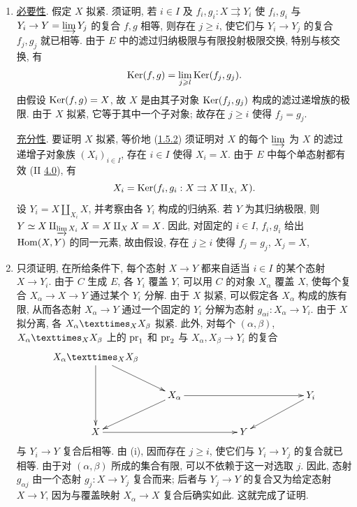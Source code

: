 \begin{enumerate}
\renewcommand{\theenumi}{\roman{enumi}}
\renewcommand{\labelenumi}{(\theenumi)}
\item \underline{必要性}.
假定\pageoriginale{} $X$ 拟紧.
须证明, 若 $i\in I$ 及 $f_i,g_i:X\rightrightarrows Y_i$
使 $f_i,g_i$ 与 $Y_i\to Y=\varinjlim Y_j$ 的复合 $f,g$ 相等,
则存在 $j\geq i$,
使它们与 $Y_i\to Y_j$ 的复合 $f_j,g_j$ 就已相等.
由于 $E$ 中的滤过归纳极限与有限投射极限交换,
特别与核交换, 有
$$
\operatorname{Ker} (f, g) = \mathop{\lim}_{j\geqslant l} \operatorname{Ker} (f_j, g_j){}.
$$
由假设 $\operatorname{Ker}(f,g)=X$,
故 $X$ 是由其子对象 $\operatorname{Ker}(f_j,g_j)$ 构成的滤过递增族的极限.
由于 $X$ 拟紧, 它等于其中一个子对象;
故存在 $j\geq i$ 使得 $f_j=g_j$.

\underline{充分性}.
要证明 $X$ 拟紧,
等价地 (\hyperref[VI.subsubsec1.5.2]{1.5.2})
须证明对 $X$ 的每个 $\varinjlim$ 为 $X$ 的滤过递增子对象族
$(X_i)_{i\in I}$, 存在 $i\in I$ 使得 $X_i=X$.
由于 $E$ 中每个单态射都有效 (II \hyperref[II.sec4]{4.0}), 有
$$
X_i = \operatorname{Ker} (f_i, g_i : X \rightrightarrows X \amalg_{X_{i}} X){}.
$$
设 $Y_i=X\amalg_{X_i}X$,
并考察由各 $Y_i$ 构成的归纳系.
若 $Y$ 为其归纳极限, 则
$Y\simeq X\amalg_{\varinjlim X_i}X=X\amalg_X X=X$.
因此, 对固定的 $i\in I$,
$f_i,g_i$ 给出 $\operatorname{Hom}(X,Y)$ 的同一元素,
故由假设, 存在 $j\geq i$ 使得 $f_j=g_j$,
\ie $X_j=X$, \cqfd

\item 只须\pageoriginale{}证明,
在所给条件下, 每个态射 $X\to Y$
都来自适当 $i\in I$ 的某个态射 $X\to Y_i$.
由于 $C$ 生成 $E$, 各 $Y_i$ 覆盖 $Y$,
可以用 $C$ 的对象 $X_{\alpha}$ 覆盖 $X$,
使每个复合 $X_{\alpha}\to X\to Y$ 通过某个 $Y_i$ 分解.
由于 $X$ 拟紧, 可以假定各 $X_{\alpha}$ 构成的族有限,
从而各态射 $X_{\alpha}\to Y$ 通过一个固定的 $Y_i$
分解为态射 $g_{\alpha i}:X_{\alpha}\to Y_i$.
由于 $X$ 拟分离, 各 $\fprod{X_{\alpha}}{X_{\beta}}{X}$ 拟紧.
此外, 对每个 $(\alpha,\beta)$,
$\fprod{X_{\alpha}}{X_{\beta}}{X}$ 上的 $\operatorname{pr}_1$ 和 $\operatorname{pr}_2$
与 $X_{\alpha},X_{\beta}\to Y_i$ 的复合
\[
\xymatrix{
\fprod{X_{\alpha}}{X_{\beta}}{X} \ar[rd] \ar[dd]& &\\
                            &X_{\alpha} \ar[ld] \ar[rrrr]&   & & & Y_i
\ar[lld]\\
X    \ar[rrr]                       &          & & Y  &
}
\]
与 $Y_i\to Y$ 复合后相等.
由 (i), 因而存在 $j\geq i$,
使它们与 $Y_i\to Y_j$ 的复合就已相等.
由于对 $(\alpha,\beta)$ 所成的集合有限,
可以不依赖于这一对选取 $j$.
因此, 态射 $g_{\alpha j}$
由一个态射 $g_j:X\to Y_j$ 复合而来;
后者与 $Y_j\to Y$ 的复合又为给定态射 $X\to Y$,
因为与覆盖映射 $X_{\alpha}\to X$ 复合后确实如此.
这就完成了证明.
\end{enumerate}


